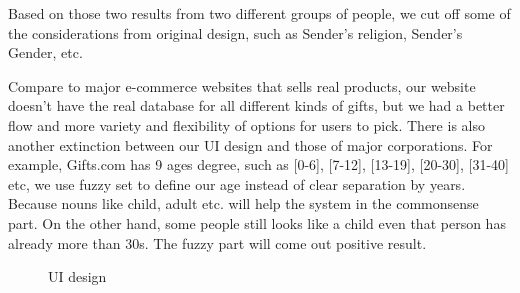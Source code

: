 \documentclass[11pt,twocolumn]{article}
\begin{document}
Based on those two results from two different groups of people, we cut off some of the considerations from original design, such as Sender's religion, Sender's Gender, etc.




Compare to major e-commerce websites that sells real products, our website doesn't have the real database for all different kinds of gifts, but we had a better flow and more variety and flexibility of options for users to pick. There is also another extinction between our UI design and those of major corporations. For example, Gifts.com has 9 ages degree, such as [0-6], [7-12], [13-19], [20-30], [31-40] etc, we use fuzzy set to define our age instead of clear separation by years. Because nouns like child, adult etc. will help the system in the commonsense part.  On the other hand, some people still looks like a child even that person has already more than 30s.  The fuzzy part will come out positive result.




\begin{figure}[h!t]
\caption{UI design}
\label{ui}
\end{figure}
\end{document}
